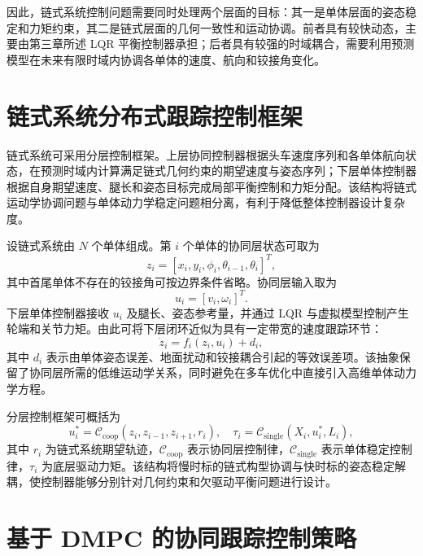 \documentclass[type=bachelor]{bithesis}
\begin{document}
因此，链式系统控制问题需要同时处理两个层面的目标：其一是单体层面的姿态稳定和力矩约束，其二是链式层面的几何一致性和运动协调。前者具有较快动态，主要由第三章所述 LQR 平衡控制器承担；后者具有较强的时域耦合，需要利用预测模型在未来有限时域内协调各单体的速度、航向和铰接角变化。

\section{链式系统分布式跟踪控制框架}
链式系统可采用分层控制框架。上层协同控制器根据头车速度序列和各单体航向状态，在预测时域内计算满足链式几何约束的期望速度与姿态序列；下层单体控制器根据自身期望速度、腿长和姿态目标完成局部平衡控制和力矩分配。该结构将链式运动学协调问题与单体动力学稳定问题相分离，有利于降低整体控制器设计复杂度。



设链式系统由 $N$ 个单体组成。第 $i$ 个单体的协同层状态可取为
\begin{equation}
  z_i=[x_i,y_i,\phi_i,\theta_{i-1},\theta_i]^T ,
\end{equation}
其中首尾单体不存在的铰接角可按边界条件省略。协同层输入取为
\begin{equation}
  u_i=[v_i,\omega_i]^T .
\end{equation}
下层单体控制器接收 $u_i$ 及腿长、姿态参考量，并通过 LQR 与虚拟模型控制产生轮端和关节力矩。由此可将下层闭环近似为具有一定带宽的速度跟踪环节：
\begin{equation}
  \dot{z}_i=f_i(z_i,u_i)+d_i ,
\end{equation}
其中 $d_i$ 表示由单体姿态误差、地面扰动和铰接耦合引起的等效误差项。该抽象保留了协同层所需的低维运动学关系，同时避免在多车优化中直接引入高维单体动力学方程。

分层控制框架可概括为
\begin{equation}
  u_i^\ast=\mathcal{C}_{\mathrm{coop}}(z_i,z_{i-1},z_{i+1},r_i),
  \quad
  \tau_i=\mathcal{C}_{\mathrm{single}}(X_i,u_i^\ast,L_i),
\end{equation}
其中 $r_i$ 为链式系统期望轨迹，$\mathcal{C}_{\mathrm{coop}}$ 表示协同层控制律，$\mathcal{C}_{\mathrm{single}}$ 表示单体稳定控制律，$\tau_i$ 为底层驱动力矩。该结构将慢时标的链式构型协调与快时标的姿态稳定解耦，使控制器能够分别针对几何约束和欠驱动平衡问题进行设计。

\section{基于 DMPC 的协同跟踪控制策略}
\end{document}
